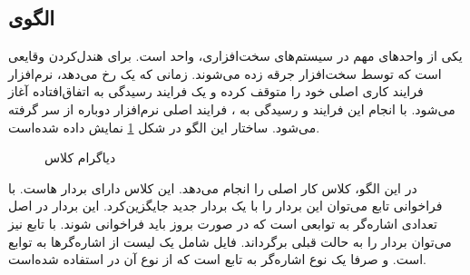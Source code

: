 \subsection{الگوی }
\label{HWInterruptSec}
\begin{RTL}
یکی از واحدهای مهم در سیستم‌های سخت‌افزاری، واحد  است.
 برای هندل‌کردن وقایعی است که توسط سخت‌افزار جرقه زده می‌شوند.
زمانی که یک  رخ می‌دهد، نرم‌افزار فرایند کاری اصلی خود را متوقف
کرده و یک فرایند رسیدگی به  اتفاق‌افتاده آغاز می‌شود. با انجام
این فرایند و رسیدگی به ، فرایند اصلی نرم‌افزار دوباره از سر گرفته
می‌شود. ساختار این الگو در شکل \ref{HWInterruptClassDiag}
نمایش داده شده‌است.
\end{RTL}
\begin{figure}[h!]
\centering
{}
\caption{دیاگرام کلاس }
\label{HWInterruptClassDiag}
\end{figure}
\begin{RTL}
در این الگو، کلاس  کار اصلی را انجام می‌دهد.
این کلاس دارای بردار هاست.
با فراخوانی تابع  می‌توان این بردار را با یک بردار جدید جایگزین‌کرد.
این بردار در اصل تعدادی اشاره‌گر به توابعی است که در صورت بروز 
باید فراخوانی شوند. با تابع  نیز می‌توان بردار را به حالت قبلی
برگرداند. فایل  شامل یک لیست از
اشاره‌گرها به توابع  است.
و  صرفا یک نوع اشاره‌گر به تابع است که از نوع آن در
 استفاده شده‌است.
\end{RTL}